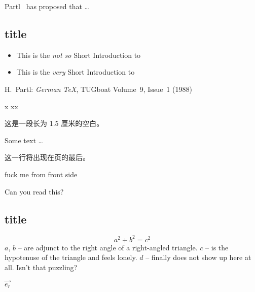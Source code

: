 \documentclass[UTF8]{ctexart}
\newcommand{\txsit}[1]
{This is the \emph{#1} Short
	Introduction to \LaTeXe}
\begin{document}
Partl~\cite{pa} has
proposed that \ldots

\printindex

\subsection{title}
\begin{itemize}
	\item \txsit{not so}
	\item \txsit{very}
\end{itemize}

\begin{thebibliography}{99}
	 H.~Partl:
	\emph{German \TeX},
	TUGboat Volume~9, Issue~1 (1988)
\end{thebibliography}

x
xx

这是\hspace{1.5cm}一段长为
1.5 厘米的空白。

Some text \ldots

这一行将出现在页的最后。\pagebreak

fuck me 
\bigskip
from front side

\par
{}\par
{} \par
{} \par
{}
Can you read this?

\settowidth{\parindent}{slslsls}


\subsection{title}
\flushleft
\newenvironment{vardesc}[1]{%
	\settowidth{\parindent}{#1:\ }
	\makebox[0pt][r]{#1:\ }}{}
\begin{displaymath}
a^2+b^2=c^2
\end{displaymath}
\flushright
\begin{vardesc}{Where}$a$,
	$b$ -- are adjunct to the right
	angle of a right-angled triangle.
	$c$ -- is the hypotenuse of
\flushleft
	the triangle and feels lonely.
	$d$ -- finally does not show up
	here at all. Isn’t that puzzling?
\end{vardesc}

$\vec{e_r}$
\end{document}
